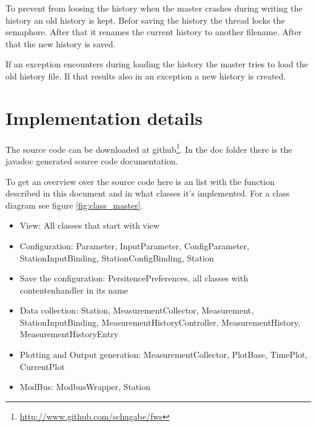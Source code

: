 To prevent from loosing the history when the master crashes during writing the history an old history is kept. Befor saving the history the thread locks the semaphore. After that it renames the current history to another filename. After that the new history is saved.

If an exception encounters during loading the history the master tries to load the old history file. If that results also in an exception a new history is created.

\section{Implementation details} %
\label{sec:implementation_details}
The source code can be downloaded at github\footnote{\url{http://www.github.com/schugabe/fws}}. In the doc folder there is the javadoc generated source code documentation.

To get an overview over the source code here is an list with the function described in this document and in what classes it's implemented. For a class diagram see figure \ref{fig:class_master}.

\begin{itemize}
    \item View: All classes that start with view
    \item Configuration: Parameter, InputParameter, ConfigParameter, StationInputBinding, StationConfigBinding, Station
    \item Save the configuration: PersitencePreferences, all classes with contentenhandler in its name
    \item Data collection: Station, MeasurementCollector, Measurement, StationInputBinding, MeasurementHistoryController, MeasurementHistory, MeasurementHistoryEntry
    \item Plotting and Output generation: MeasurementCollector, PlotBase, TimePlot, CurrentPlot
    \item ModBus: ModbusWrapper, Station
\end{itemize}


